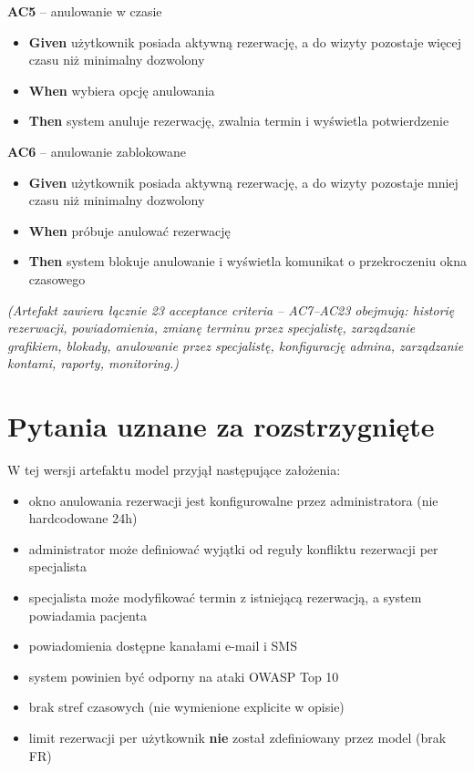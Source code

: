 \documentclass[12pt,a4paper]{article}
\begin{document}
\vspace{0.4em}
\textbf{AC5} -- anulowanie w czasie
\begin{itemize}[itemsep=2pt]
  \item \textbf{Given} użytkownik posiada aktywną rezerwację, a do wizyty pozostaje więcej czasu niż minimalny dozwolony
  \item \textbf{When} wybiera opcję anulowania
  \item \textbf{Then} system anuluje rezerwację, zwalnia termin i wyświetla potwierdzenie
\end{itemize}

\vspace{0.4em}
\textbf{AC6} -- anulowanie zablokowane
\begin{itemize}[itemsep=2pt]
  \item \textbf{Given} użytkownik posiada aktywną rezerwację, a do wizyty pozostaje mniej czasu niż minimalny dozwolony
  \item \textbf{When} próbuje anulować rezerwację
  \item \textbf{Then} system blokuje anulowanie i wyświetla komunikat o przekroczeniu okna czasowego
\end{itemize}

\vspace{0.4em}
\textit{(Artefakt zawiera łącznie 23 acceptance criteria -- AC7--AC23 obejmują: historię rezerwacji, powiadomienia, zmianę terminu przez specjalistę, zarządzanie grafikiem, blokady, anulowanie przez specjalistę, konfigurację admina, zarządzanie kontami, raporty, monitoring.)}

\section{Pytania uznane za rozstrzygnięte}

W tej wersji artefaktu model przyjął następujące założenia:

\begin{itemize}[leftmargin=1.5em]
  \item okno anulowania rezerwacji jest konfigurowalne przez administratora (nie hardcodowane 24h)
  \item administrator może definiować wyjątki od reguły konfliktu rezerwacji per specjalista
  \item specjalista może modyfikować termin z istniejącą rezerwacją, a system powiadamia pacjenta
  \item powiadomienia dostępne kanałami e-mail i SMS
  \item system powinien być odporny na ataki OWASP Top 10
  \item brak stref czasowych (nie wymienione explicite w opisie)
  \item limit rezerwacji per użytkownik \textbf{nie} został zdefiniowany przez model (brak FR)
\end{itemize}
\end{document}

